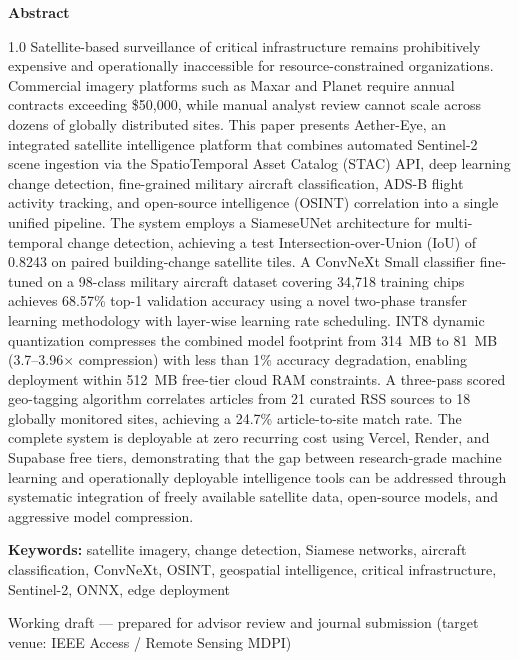 \documentclass[11pt,a4paper]{article}
\begin{document}
\begin{titlepage}
\begin{center}
\begin{minipage}{0.85\textwidth}
\centering
{\sffamily\bfseries\normalsize Abstract\par}
\vspace{0.4cm}
\begin{spacing}{1.0}
\small
Satellite-based surveillance of critical infrastructure remains prohibitively expensive and operationally inaccessible for resource-constrained organizations. Commercial imagery platforms such as Maxar and Planet require annual contracts exceeding \$50,000, while manual analyst review cannot scale across dozens of globally distributed sites. This paper presents Aether-Eye, an integrated satellite intelligence platform that combines automated Sentinel-2 scene ingestion via the SpatioTemporal Asset Catalog (STAC) API, deep learning change detection, fine-grained military aircraft classification, ADS-B flight activity tracking, and open-source intelligence (OSINT) correlation into a single unified pipeline. The system employs a SiameseUNet architecture for multi-temporal change detection, achieving a test Intersection-over-Union (IoU) of 0.8243 on paired building-change satellite tiles. A ConvNeXt Small classifier fine-tuned on a 98-class military aircraft dataset covering 34,718 training chips achieves 68.57\% top-1 validation accuracy using a novel two-phase transfer learning methodology with layer-wise learning rate scheduling. INT8 dynamic quantization compresses the combined model footprint from 314~MB to 81~MB (3.7--3.96$\times$ compression) with less than 1\% accuracy degradation, enabling deployment within 512~MB free-tier cloud RAM constraints. A three-pass scored geo-tagging algorithm correlates articles from 21 curated RSS sources to 18 globally monitored sites, achieving a 24.7\% article-to-site match rate. The complete system is deployable at zero recurring cost using Vercel, Render, and Supabase free tiers, demonstrating that the gap between research-grade machine learning and operationally deployable intelligence tools can be addressed through systematic integration of freely available satellite data, open-source models, and aggressive model compression.
\end{spacing}

\vspace{0.5cm}
{\small\textbf{Keywords:} satellite imagery, change detection, Siamese networks, aircraft classification, ConvNeXt, OSINT, geospatial intelligence, critical infrastructure, Sentinel-2, ONNX, edge deployment\par}
\end{minipage}

\vfill
{\footnotesize Working draft --- prepared for advisor review and journal submission (target venue: IEEE Access / Remote Sensing MDPI)\par}
\end{center}
\end{titlepage}
\end{document}
